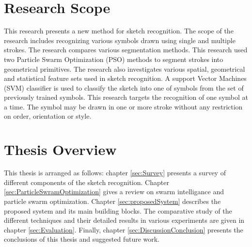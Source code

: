 \section{Research Scope}
This research  presents a new method for sketch recognition. The scope of the research includes recognizing various symbols drawn using single and multiple strokes. The research compares various segmentation methods. This research used two Particle Swarm Optimization (PSO) \cite{PSOFirst} methods to segment strokes into geometrical primitives. The research also investigates various spatial, geometrical and statistical feature sets used in sketch recognition. A support Vector Machines (SVM) classifier \cite{svmintroduce} is used to classify the sketch into one of symbols from the set of previously trained symbols. This research targets the recognition of one symbol at a time. The symbol may be drawn in one or more stroke without any restriction on order, orientation or style.

 
\section{Thesis Overview}
This thesis is arranged as follows: chapter \ref{sec:Survey} presents a survey of different components of the sketch recognition. Chapter \ref{sec:ParticleSwramOptimization} gives a review on swarm intelligance and particle swarm optimization.  Chapter \ref{sec:proposedSystem} describes the proposed system and its main building blocks. The comparative study of the different techniques and their detailed results in various experiments are given in chapter \ref{sec:Evaluation}. Finally, chapter \ref{sec:DiscussionConclusion} presents the conclusions of this thesis and suggested future work.
